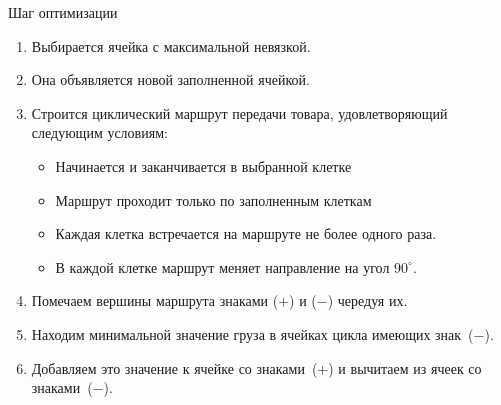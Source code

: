 \documentclass[unicode,11pt,notheorems,xcolor=table]{beamer}
\newtheorem{theorem}{Теорема}
\begin{document}


\begin{frame}{Шаг оптимизации}{}
	
	\begin{enumerate}
		\item 
		Выбирается ячейка с максимальной невязкой.
		\item 
		Она объявляется новой заполненной ячейкой.
		\item 
		Строится циклический маршрут передачи товара, удовлетворяющий следующим условиям:
		\begin{itemize}
			\item Начинается и заканчивается в выбранной клетке
			\item Маршрут проходит только по заполненным клеткам
			\item Каждая клетка встречается на маршруте не более одного раза.
			\item В каждой клетке маршрут меняет направление на угол $90^\circ$.
		\end{itemize}
		\item 
		Помечаем вершины маршрута знаками ($+$) и ($-$) чередуя их.
		\item 	
		Находим минимальной значение груза в ячейках цикла имеющих знак~($-$).
		\item 	
		Добавляем это значение к ячейке со знаками~($+$) и вычитаем из ячеек со  знаками~($-$).	
	\end{enumerate}
	
\end{frame}
\end{document}
